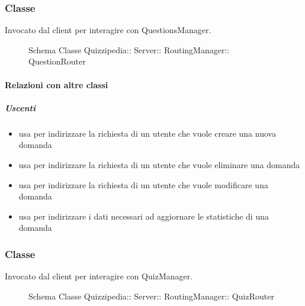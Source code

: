 \subsubsection{Classe }
Invocato dal client per interagire con QuestionsManager.
\begin{figure}[H]
\centering
\noindent{}
\caption[Schema Classe QuestionRouter]{Schema Classe Quizzipedia:: Server:: RoutingManager:: QuestionRouter}
\end{figure}
\paragraph{Relazioni con altre classi}
\subparagraph{Uscenti}
\begin{itemize}
\item usa  per indirizzare la richiesta di un utente che vuole creare una nuova domanda
\item usa  per indirizzare la richiesta di un utente che vuole eliminare una domanda
\item usa  per indirizzare la richiesta di un utente che vuole modificare una domanda
\item usa  per indirizzare i dati necessari ad aggiornare le statistiche di una domanda
\end{itemize}
\subsubsection{Classe }
Invocato dal client per interagire con QuizManager.
\begin{figure}[H]
\centering
\noindent{}
\caption[Schema Classe QuizRouter]{Schema Classe Quizzipedia:: Server:: RoutingManager:: QuizRouter}
\end{figure}
